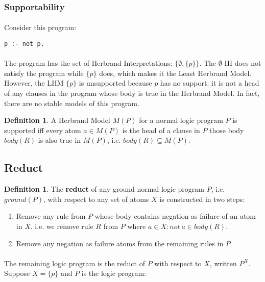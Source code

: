 \documentclass{article}
\theoremstyle{plain}
\theoremstyle{definition}
\newtheorem{defn}[thm]{Definition} %
\begin{document}
\begin{multicols}{2}
\subsubsection{Supportability}

\paragraph{} Consider this program:

\begin{lstlisting}
p :- not p.
\end{lstlisting}

\paragraph{} The program has the set of Herbrand Interpretations: $\{\emptyset, \{p\}\}$. The $\emptyset$ HI does not satisfy the program while $\{p\}$ does, which makes it the Least Herbrand Model. However, the LHM $\{p\}$ is unsupported because $p$ has no support: it is not a head of any clauses in the program whose body is true in the Herbrand Model. In fact, there are no stable models of this program.

\begin{defn}A Herbrand Model $M(P)$ for a normal logic program $P$ is supported iff every atom $a \in M(P)$ is the head of a clause in $P$ those body $body(R)$ is also true in $M(P)$, i.e. $body(R) \subseteq M(P)$. \end{defn}

\subsection{Reduct}

\begin{defn}The \textbf{reduct} of any ground normal logic program $P$, i.e. $ground(P)$, with respect to any set of atoms $X$ is constructed in two steps:\end{defn}

\begin{enumerate}
\item Remove any rule from $P$ whose body contains negation as failure of an atom in $X$. i.e. we remove rule $R$ from $P$ where $a \in X: not\ a \in body(R)$.
\item Remove any negation as failure atoms from the remaining rules in $P$.
\end{enumerate}

\paragraph{} The remaining logic program is the reduct of $P$ with respect to $X$, written $P^X$. Suppose $X = \{p\}$ and $P$ is the logic program:


\end{multicols}
\end{document}
